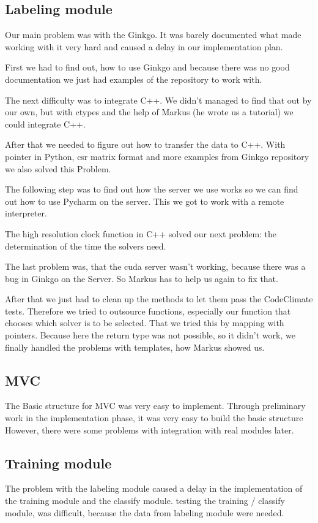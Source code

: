 \documentclass[parskip=full]{scrartcl}
\begin{document}
\subsection{Labeling module}
Our main problem was with the \gls{Ginkgo}. 
It was barely documented what made working with it very hard and caused a delay in our implementation plan. 

First we had to find out, how to use \gls{Ginkgo} and because there was no good documentation we just had examples of the repository to work with.

The next difficulty was to integrate \gls{C++}.
We didn't managed to find that out by our own, but with \gls{ctypes} and the help of Markus (he wrote us a tutorial) we could integrate \gls{C++}.

After that we needed to figure out how to transfer the data to \gls{C++}.
With \gls{pointer} in \gls{Python}, csr matrix format and more examples from \gls{Ginkgo} repository we also solved this Problem.

The following step was to find out how the server we use works so we can find out how to use \gls{Pycharm} on the server.
This we got to work with a \gls{remote interpreter}.

The high resolution clock function in \gls{C++} solved our next problem: the determination of the time the solvers need.

The last problem was, that the \gls{cuda} server wasn't working, because there was a bug in \gls{Ginkgo} on the Server.
So Markus has to help us again to fix that.

After that we just had to clean up the methods to let them pass the \gls{CodeClimate} tests.
Therefore we tried to outsource functions, especially our function that chooses which solver is to be selected.
That we tried this by mapping with \glspl{pointer}.
Because here the return type was not possible, so it didn't work, we finally handled the problems with templates, how Markus showed us.


\subsection{MVC}
The Basic structure for MVC was very easy to implement.
Through preliminary work in the implementation phase, it was very easy to build the basic structure 
However, there were some problems with integration with real modules later.
\subsection{Training module}
The problem with the \gls{labeling module} caused a delay in the implementation of the \gls{training module} and the \gls{classify module}.
testing the training / \gls{classify module}, was difficult, because the data from \gls{labeling module} were needed.
\end{document}
